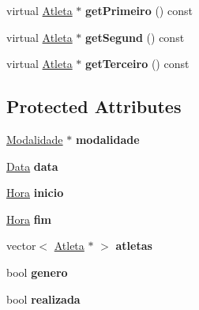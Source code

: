 \begin{DoxyCompactItemize}
\item 
\hypertarget{class_prova_a4ffec0f4de576943a544f340ce3d520c}{}virtual \hyperlink{class_atleta}{Atleta} $\ast$ {\bfseries get\+Primeiro} () const \label{class_prova_a4ffec0f4de576943a544f340ce3d520c}

\item 
\hypertarget{class_prova_a32d3980cd96e2001b28d965b08ffcfa4}{}virtual \hyperlink{class_atleta}{Atleta} $\ast$ {\bfseries get\+Segund} () const \label{class_prova_a32d3980cd96e2001b28d965b08ffcfa4}

\item 
\hypertarget{class_prova_a7021cffdc17608a243f19cdde4dfdef3}{}virtual \hyperlink{class_atleta}{Atleta} $\ast$ {\bfseries get\+Terceiro} () const \label{class_prova_a7021cffdc17608a243f19cdde4dfdef3}

\end{DoxyCompactItemize}
\subsection*{Protected Attributes}
\begin{DoxyCompactItemize}
\item 
\hypertarget{class_prova_a72061eddcdd4bbe05f083f812fd4c233}{}\hyperlink{class_modalidade}{Modalidade} $\ast$ {\bfseries modalidade}\label{class_prova_a72061eddcdd4bbe05f083f812fd4c233}

\item 
\hypertarget{class_prova_a18c9307475b75a77097e3f7b3b95359a}{}\hyperlink{class_data}{Data} {\bfseries data}\label{class_prova_a18c9307475b75a77097e3f7b3b95359a}

\item 
\hypertarget{class_prova_ae258a1a827472ff56e43910ff2b81a7e}{}\hyperlink{class_hora}{Hora} {\bfseries inicio}\label{class_prova_ae258a1a827472ff56e43910ff2b81a7e}

\item 
\hypertarget{class_prova_a67feb63b78712f2cd8aa0348c7e855ed}{}\hyperlink{class_hora}{Hora} {\bfseries fim}\label{class_prova_a67feb63b78712f2cd8aa0348c7e855ed}

\item 
\hypertarget{class_prova_a8561eecd9076cb8707eb99d90a89989d}{}vector$<$ \hyperlink{class_atleta}{Atleta} $\ast$ $>$ {\bfseries atletas}\label{class_prova_a8561eecd9076cb8707eb99d90a89989d}

\item 
\hypertarget{class_prova_a633da82d6916845b64bd5bdc2c6d6ad9}{}bool {\bfseries genero}\label{class_prova_a633da82d6916845b64bd5bdc2c6d6ad9}

\item 
\hypertarget{class_prova_ac2d537804224ac83c957db49ffcecef6}{}bool {\bfseries realizada}\label{class_prova_ac2d537804224ac83c957db49ffcecef6}

\end{DoxyCompactItemize}
